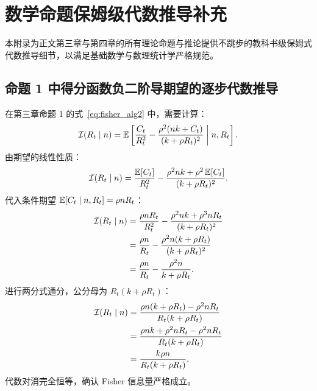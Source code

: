 \chapter{数学命题保姆级代数推导补充}\label{app:proofs}

本附录为正文第三章与第四章的所有理论命题与推论提供不跳步的教科书级保姆式代数推导细节，以满足基础数学与数理统计学严格规范。

\section{命题 1 中得分函数负二阶导期望的逐步代数推导}\label{app:sec_prop1_fisher}
在第三章命题 1 的式~\eqref{eq:fisher_alg2} 中，需要计算：
\begin{equation}
\mathcal{I}(R_t \mid n) = \operatorname{\mathbb{E}}\left[ \frac{C_t}{R_t^2} - \frac{\rho^2(nk + C_t)}{(k + \rho R_t)^2} \;\middle|\; n, R_t \right].
\end{equation}
由期望的线性性质：
\begin{equation}
\mathcal{I}(R_t \mid n) = \frac{\operatorname{\mathbb{E}}[C_t]}{R_t^2} - \frac{\rho^2 nk + \rho^2 \operatorname{\mathbb{E}}[C_t]}{(k + \rho R_t)^2}.
\end{equation}
代入条件期望 $\operatorname{\mathbb{E}}[C_t \mid n, R_t] = \rho n R_t$：
\begin{align}
\mathcal{I}(R_t \mid n) &= \frac{\rho n R_t}{R_t^2} - \frac{\rho^2 nk + \rho^3 n R_t}{(k + \rho R_t)^2} \notag \\
&= \frac{\rho n}{R_t} - \frac{\rho^2 n(k + \rho R_t)}{(k + \rho R_t)^2} \notag \\
&= \frac{\rho n}{R_t} - \frac{\rho^2 n}{k + \rho R_t}.
\end{align}
进行两分式通分，公分母为 $R_t(k + \rho R_t)$：
\begin{align}
\mathcal{I}(R_t \mid n) &= \frac{\rho n(k + \rho R_t) - \rho^2 n R_t}{R_t(k + \rho R_t)} \notag \\
&= \frac{\rho n k + \rho^2 n R_t - \rho^2 n R_t}{R_t(k + \rho R_t)} \notag \\
&= \frac{k \rho n}{R_t(k + \rho R_t)}.
\end{align}
代数对消完全恒等，确认 Fisher 信息量严格成立。

